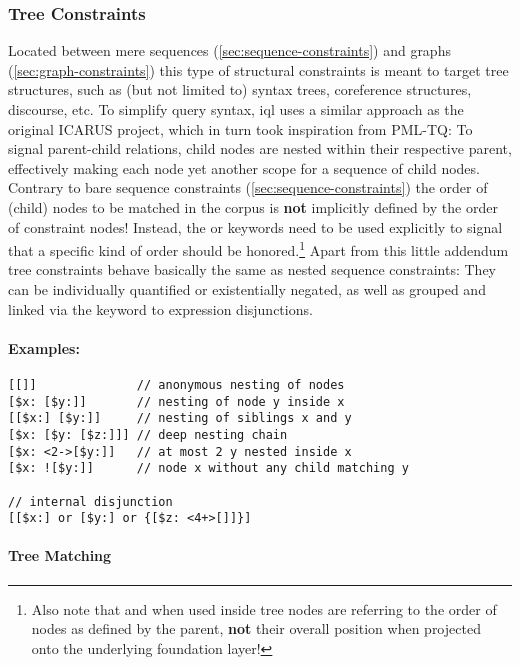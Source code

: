 \documentclass[11pt,a4paper]{article}
\begin{document}
\subsubsection{Tree Constraints}
\label{sec:tree-constraints}

Located between mere sequences (\ref{sec:sequence-constraints}) and graphs (\ref{sec:graph-constraints}) this type of structural constraints is meant to target tree structures, such as (but not limited to) syntax trees, coreference structures, discourse, etc.
To simplify query syntax, \ac{iql} uses a similar approach as the original ICARUS project, which in turn took inspiration from PML-TQ:
To signal parent-child relations, child nodes are nested within their respective parent, effectively making each node yet another scope for a sequence of child nodes.
Contrary to bare sequence constraints (\ref{sec:sequence-constraints}) the order of (child) nodes to be matched in the corpus is \textbf{not} implicitly defined by the order of constraint nodes!
Instead, the  or  keywords need to be used explicitly to signal that a specific kind of order should be honored.\footnote{Also note that  and  when used inside tree nodes are referring to the order of nodes as defined by the parent, \textbf{not} their overall position when projected onto the underlying foundation layer!}
Apart from this little addendum tree constraints behave basically the same as nested sequence constraints:
They can be individually quantified or existentially negated, as well as grouped and linked via the  keyword to expression disjunctions.

\paragraph{Examples:}

\begin{Verbatim}[samepage=true]
[[]]              // anonymous nesting of nodes
[$x: [$y:]]       // nesting of node y inside x
[[$x:] [$y:]]     // nesting of siblings x and y
[$x: [$y: [$z:]]] // deep nesting chain 
[$x: <2->[$y:]]   // at most 2 y nested inside x
[$x: ![$y:]]      // node x without any child matching y

// internal disjunction
[[$x:] or [$y:] or {[$z: <4+>[]]}]
\end{Verbatim}

\paragraph{Tree Matching}
\end{document}
